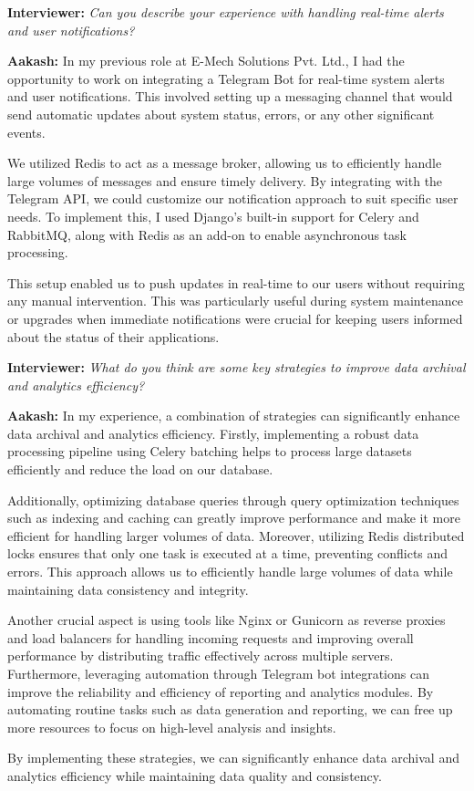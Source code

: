 \documentclass[12pt, a4paper]{article}
\newcommand{\interviewer}[1]{\noindent\textbf{Interviewer: }\textit{#1}\par\vspace{5pt}}
\newcommand{\candidate}[1]{\noindent\textbf{Aakash: }#1\par\vspace{15pt}}
\begin{document}
\interviewer{Can you describe your experience with handling real-time alerts and user notifications?}
\candidate{
In my previous role at E-Mech Solutions Pvt. Ltd., I had the opportunity to work on integrating a Telegram Bot for real-time system alerts and user notifications. This involved setting up a messaging channel that would send automatic updates about system status, errors, or any other significant events.

We utilized Redis to act as a message broker, allowing us to efficiently handle large volumes of messages and ensure timely delivery. By integrating with the Telegram API, we could customize our notification approach to suit specific user needs.
To implement this, I used Django's built-in support for Celery and RabbitMQ, along with Redis as an add-on to enable asynchronous task processing.

This setup enabled us to push updates in real-time to our users without requiring any manual intervention. This was particularly useful during system maintenance or upgrades when immediate notifications were crucial for keeping users informed about the status of their applications.
}

\interviewer{What do you think are some key strategies to improve data archival and analytics efficiency?}
\candidate{
In my experience, a combination of strategies can significantly enhance data archival and analytics efficiency. Firstly, implementing a robust data processing pipeline using Celery batching helps to process large datasets efficiently and reduce the load on our database.

Additionally, optimizing database queries through query optimization techniques such as indexing and caching can greatly improve performance and make it more efficient for handling larger volumes of data.
Moreover, utilizing Redis distributed locks ensures that only one task is executed at a time, preventing conflicts and errors. This approach allows us to efficiently handle large volumes of data while maintaining data consistency and integrity.

Another crucial aspect is using tools like Nginx or Gunicorn as reverse proxies and load balancers for handling incoming requests and improving overall performance by distributing traffic effectively across multiple servers.
Furthermore, leveraging automation through Telegram bot integrations can improve the reliability and efficiency of reporting and analytics modules. By automating routine tasks such as data generation and reporting, we can free up more resources to focus on high-level analysis and insights.

By implementing these strategies, we can significantly enhance data archival and analytics efficiency while maintaining data quality and consistency.
}
\end{document}
